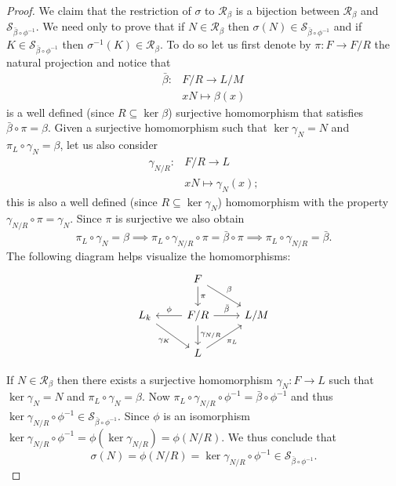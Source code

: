 \begin{proof}
    
    We claim that the restriction of $\sigma$ to $\mathscr{R}_\beta$ is a bijection between $\mathscr{R}_\beta$ and $\mathscr{S}_{\bar{\beta} \circ \phi^{-1}}$. We need only to prove that if $N \in \mathscr{R}_\beta$ then $\sigma{(N)} \in \mathscr{S}_{\bar{\beta} \circ \phi^{-1}}$ and if $K \in \mathscr{S}_{\bar{\beta} \circ \phi^{-1}}$ then $\sigma^{-1}(K) \in \mathscr{R}_\beta$. To do so let us first denote by $\pi \colon F \rightarrow F/R$ the natural projection and notice that
    \begin{align*}
        \bar{\beta} \colon & F/R \rightarrow L/M \\
        & xN \mapsto \beta(x)
    \end{align*}
    is a well defined (since $R \subseteq \ker \beta$) surjective homomorphism that satisfies $\bar{\beta} \circ \pi  = \beta$. Given a surjective homomorphism such that $\ker \gamma_N = N$ and $\pi_L \circ \gamma_N = \beta$, let us also consider
    \begin{align*}
        \gamma_{N/R} \colon & F/R \rightarrow L \\
        & xN \mapsto \gamma_N(x);
    \end{align*}
    this is also a well defined (since $R \subseteq \ker \gamma_N$) homomorphism with the property $\gamma_{N/R} \circ \pi = \gamma_N$. Since $\pi$ is surjective we also obtain
    $$
    \pi_L \circ \gamma_N = \beta \implies \pi_L \circ \gamma_{N/R} \circ \pi = \bar{\beta} \circ \pi \implies \pi_L \circ \gamma_{N/R} = \bar{\beta}.
    $$  
    The following diagram helps visualize the homomorphisms:
    \[\begin{tikzcd}
        & F \\
        {L_k} & {F/R} & {L/M} \\
        & L
        \arrow["{\pi_L}"', from=3-2, to=2-3]
        \arrow["{\bar{\beta}}", from=2-2, to=2-3]
        \arrow["{\gamma_K}"', from=2-1, to=3-2]
        \arrow["\pi", from=1-2, to=2-2]
        \arrow["\beta", from=1-2, to=2-3]
        \arrow["{\gamma_{N/R}}", from=2-2, to=3-2]
        \arrow["\phi"', from=2-2, to=2-1]
    \end{tikzcd}\]

    If $N \in \mathscr{R}_\beta$ then there exists a surjective homomorphism $\gamma_N \colon F \rightarrow L$ such that $\ker \gamma_N = N$ and $\pi_L \circ \gamma_N = \beta$. 
    Now $\pi_L \circ \gamma_{N/R} \circ \phi^{-1} = \bar{\beta} \circ \phi^{-1}$ and thus $\ker {\gamma_{N/R} \circ \phi^{-1}} \in \mathscr{S}_{\bar{\beta} \circ \phi^{-1}}$. 
    Since $\phi$ is an isomorphism $\ker{\gamma_{N/R} \circ \phi^{-1}} = \phi(\ker \gamma_{N/R}) = \phi(N/R)$. We thus conclude that 
    $$\sigma(N) = \phi(N/R) = \ker{\gamma_{N/R} \circ \phi^{-1}} \in \mathscr{S}_{\bar{\beta} \circ \phi^{-1}}.$$   



\end{proof}
